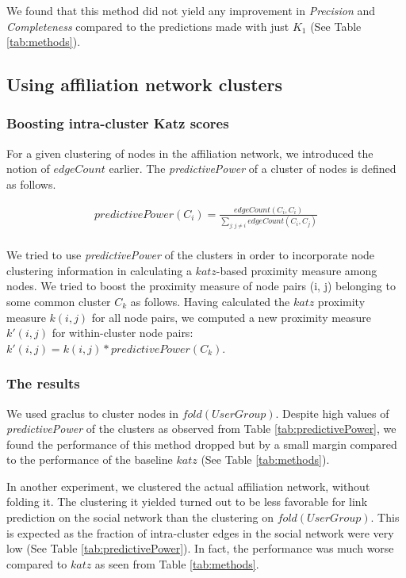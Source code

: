 \documentclass{report}
\begin{document}
We found that this method did not yield any improvement in \textit{Precision} and \textit{Completeness} compared to the predictions made with just $K_1$ (See Table \ref{tab:methods}).

\subsection{Using affiliation network clusters}
\subsubsection{Boosting intra-cluster Katz scores}
For a given clustering of nodes in the affiliation network, we introduced the notion of $edgeCount$ earlier. The \textit{predictivePower} of a cluster of nodes is defined as follows.

\begin{eqnarray*}
predictivePower(C_i) = \frac{edgeCount(C_i, C_i)}{\sum_{j: j \neq i}edgeCount(C_i, C_j)}\\
\end{eqnarray*}


We tried to use \textit{predictivePower} of the clusters in order to incorporate node clustering information in calculating a $katz$-based proximity measure among nodes. We tried to boost the proximity measure of node pairs (i, j) belonging to some common cluster $C_k$ as follows. Having calculated the $katz$ proximity measure $k(i,j)$ for all node pairs, we computed a new proximity measure $k'(i, j)$ for within-cluster node pairs: $k'(i, j) = k(i, j)*predictivePower(C_k)$.

\subsubsection{The results}
We used graclus to cluster nodes in $fold(UserGroup)$. Despite high values of \textit{predictivePower} of the clusters as observed from Table \ref{tab:predictivePower}, we found the performance of this method dropped but by a small margin compared to the performance of the baseline $katz$ (See Table \ref{tab:methods}).

In another experiment, we clustered the actual affiliation network, without folding it. The clustering it yielded turned out to be less favorable for link prediction on the social network than the clustering on $fold(UserGroup)$. This is expected as the fraction of intra-cluster edges in the social network were very low (See Table \ref{tab:predictivePower}). In fact, the performance was much worse compared to $katz$ as seen from Table \ref{tab:methods}.
\end{document}
